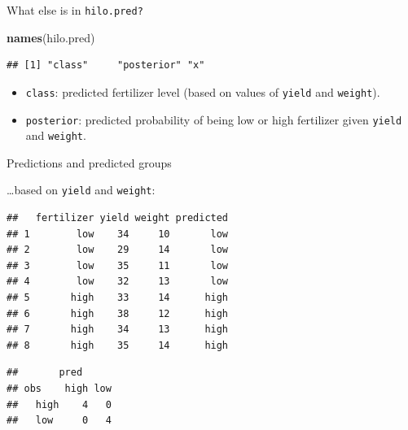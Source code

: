 \documentclass[ignorenonframetext,]{beamer}
\newenvironment{Shaded}{\begin{snugshade}}{\end{snugshade}}
\newcommand{\DataTypeTok}[1]{\textcolor[rgb]{0.13,0.29,0.53}{#1}}
\newcommand{\KeywordTok}[1]{\textcolor[rgb]{0.13,0.29,0.53}{\textbf{#1}}}
\newcommand{\NormalTok}[1]{#1}
\newcommand{\OperatorTok}[1]{\textcolor[rgb]{0.81,0.36,0.00}{\textbf{#1}}}
\begin{document}
\begin{frame}[fragile]{What else is in \texttt{hilo.pred?}}
\protect\hypertarget{what-else-is-in-hilo.pred}{}

\begin{Shaded}
\begin{Highlighting}[]
\KeywordTok{names}\NormalTok{(hilo.pred)}
\end{Highlighting}
\end{Shaded}

\begin{verbatim}
## [1] "class"     "posterior" "x"
\end{verbatim}

\begin{itemize}
\item
  \texttt{class}: predicted fertilizer level (based on values of
  \texttt{yield} and \texttt{weight}).
\item
  \texttt{posterior}: predicted probability of being low or high
  fertilizer given \texttt{yield} and \texttt{weight}.
\end{itemize}

\end{frame}

\begin{frame}[fragile]{Predictions and predicted groups}
\protect\hypertarget{predictions-and-predicted-groups}{}

\ldots based on \texttt{yield} and \texttt{weight}:

\begin{Shaded}
\end{Shaded}

\begin{verbatim}
##   fertilizer yield weight predicted
## 1        low    34     10       low
## 2        low    29     14       low
## 3        low    35     11       low
## 4        low    32     13       low
## 5       high    33     14      high
## 6       high    38     12      high
## 7       high    34     13      high
## 8       high    35     14      high
\end{verbatim}

\begin{Shaded}
\end{Shaded}

\begin{verbatim}
##       pred
## obs    high low
##   high    4   0
##   low     0   4
\end{verbatim}

\end{frame}
\end{document}
